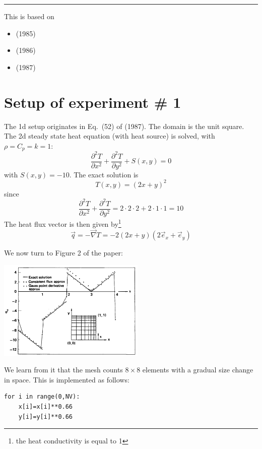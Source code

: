 \par\noindent\rule{\textwidth}{0.4pt}



This \stone is based on 
\begin{itemize}
\item {} (1985) 
\item {} (1986) 
\item {} (1987)
\end{itemize}

\section*{Setup of experiment \# 1}

The 1d setup originates in Eq.~(52) of \textcite{grls87} (1987).
The domain is the unit square. 
The 2d steady state heat equation (with heat source) is solved, with $\rho=C_p=k=1$:
\[
\frac{\partial^2 T}{\partial x^2} + \frac{\partial^2 T}{\partial y^2} + S(x,y) = 0
\]
with $S(x,y)=-10$. 
The exact solution is 
\[
T(x,y)=(2x+y)^2
\]
since 
\[
\frac{\partial^2 T}{\partial x^2} + \frac{\partial^2 T}{\partial y^2}
= 2\cdot 2 \cdot 2 + 2 \cdot 1 \cdot 1 = 10
\]
The heat flux vector is then given by\footnote{the heat conductivity is equal to 1}
\[
\vec{q} = - \vec{\nabla} T = -2(2x+y) (2 \vec{e}_x + \vec{e}_y)
\]

We now turn to Figure 2 of the paper:
\begin{center}
\includegraphics[width=7cm]{python_codes/fieldstone_173/images/grls87a}
\end{center}

We learn from it that the mesh counts $8\times 8$ elements with a gradual size change in space.
This is implemented as follows:
\begin{lstlisting}
for i in range(0,NV):
    x[i]=x[i]**0.66
    y[i]=y[i]**0.66
\end{lstlisting}

